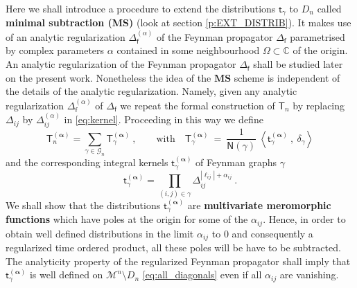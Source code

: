 \documentclass[11pt]{book}
\newcommand{\MS}{\textbf{MS}}
\newcommand{\alphabd}{\boldsymbol{\alpha}}
\newcommand{\abs}[1]{\left|#1\right|}
\newcommand{\sm}[1]{\left\langle#1\right\rangle}
\newcommand{\Gcal}{\mathcal{G}}
\newcommand{\Mcal}{\mathcal{M}}
\newcommand{\Cbb}{\mathbb{C}}
\newcommand{\Nsf}{\mathsf{N}}
\newcommand{\Tsf}{\mathsf{T}}
\newcommand{\fsf}{\mathsf{f}}
\newcommand{\tsf}{\mathsf{t}}
\theoremstyle{break}
\begin{document}
\bigskip

Here we shall introduce a procedure to extend the distributions $\tsf_\gamma$ to $D_n$ called \textbf{minimal subtraction (MS)} (look at section \ref{p:EXT_DISTRIB}). It makes use of an analytic regularization $\Delta_\fsf^{(\alpha)}$ of the Feynman propagator $\Delta_\fsf$ parametrised by complex parameters $\alpha$ contained in some neighbourhood $\Omega \subset \Cbb$ of the origin. An analytic regularization of the Feynman propagator $\Delta_\fsf$ shall be studied later on the present work. Nonetheless the idea of the $\MS$ scheme is independent of the details of the analytic regularization. Namely, given any analytic regularization $\Delta^{(\alpha)}_\fsf$ of $\Delta_\fsf$ we repeat the formal construction of $\Tsf_n$ by replacing $\Delta_{ij}$ by $\Delta^{(\alpha)}_{ij}$ in \eqref{eq:kernel}. Proceeding in this way we define 
%
\begin{equation}
\Tsf_n^{(\alphabd)} = \sum_{\gamma \in \Gcal_n} \Tsf_\gamma^{(\alphabd)} \ , \qquad \mbox{with} \quad \Tsf_\gamma^{(\alphabd)} \ = \ \frac{1}{\Nsf(\gamma)} \ \sm{\tsf_\gamma^{(\alphabd)} \ , \ \delta_\gamma}
\label{eq:time_ordered_prod_graph_reg}
\end{equation}
%
and the corresponding integral kernels $\tsf^{(\alphabd)}_\gamma$ of Feynman graphs $\gamma$ 
%
\begin{equation}
\tsf^{(\alphabd)}_\gamma = \prod_{(i,j) \in \gamma} \Delta_{ij}^{\abs{\ell_{ij}}+\alpha_{ij}} \ .
\label{eq:kernel_reg}
\end{equation}
%
We shall show that the distributions $\tsf^{(\alphabd)}_\gamma$ are \textbf{multivariate meromorphic functions} which have poles at the origin for some of the $\alpha_{ij}$. Hence, in order to obtain well defined distributions in the limit $\alpha_{ij}$ to $0$ and consequently a regularized time ordered product, all these poles will be have to be subtracted. The analyticity property of the regularized Feynman propagator shall imply that $\tsf^{(\alphabd)}_\gamma$ is well defined on $ \Mcal^n \setminus D_n $ \eqref{eq:all_diagonals} even if all $\alpha_{ij}$ are vanishing. 
\end{document}
